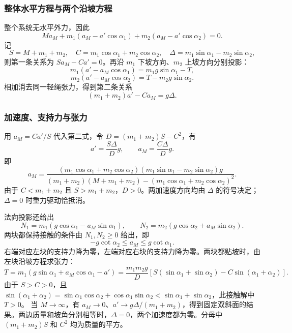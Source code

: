 \documentclass[UTF8,fontset=fandol,a4paper,11pt]{ctexart}
\begin{document}
\subsubsection*{整体水平方程与两个沿坡方程}
整个系统无水平外力，因此
\[
Ma_M+m_1(a_M-a'\cos\alpha_1)
+m_2(a_M-a'\cos\alpha_2)=0.
\]
记
\[
S=M+m_1+m_2,\quad C=m_1\cos\alpha_1+m_2\cos\alpha_2,
\quad\Delta=m_1\sin\alpha_1-m_2\sin\alpha_2,
\]
则第一条关系为 $Sa_M-Ca'=0$。再沿 $m_1$ 下坡方向、$m_2$ 上坡方向分别投影：
\[
m_1(a'-a_M\cos\alpha_1)=m_1g\sin\alpha_1-T,
\]
\[
m_2(a'-a_M\cos\alpha_2)=T-m_2g\sin\alpha_2.
\]
相加消去同一轻绳张力，得到第二条关系
\[
(m_1+m_2)a'-Ca_M=g\Delta.
\]
\subsubsection*{加速度、支持力与张力}
用 $a_M=Ca'/S$ 代入第二式，令 $D=(m_1+m_2)S-C^2$，有
\[
\boxed{a'=\frac{S\Delta}{D}g},\qquad
\boxed{a_M=\frac{C\Delta}{D}g}.
\]
即
\[
a_M=\frac{(m_1\cos\alpha_1+m_2\cos\alpha_2)
(m_1\sin\alpha_1-m_2\sin\alpha_2)g}
{(m_1+m_2)(M+m_1+m_2)-(m_1\cos\alpha_1+m_2\cos\alpha_2)^2}.
\]
由于 $C<m_1+m_2$ 且 $S>m_1+m_2$，$D>0$。两加速度方向均由 $\Delta$ 的符号决定；$\Delta=0$ 时重力驱动恰抵消。

法向投影还给出
\[
N_1=m_1(g\cos\alpha_1-a_M\sin\alpha_1),\qquad
N_2=m_2(g\cos\alpha_2+a_M\sin\alpha_2).
\]
两块都保持接触的条件由 $N_1,N_2\geq0$ 给出，即
\[
-g\cot\alpha_2\leq a_M\leq g\cot\alpha_1 .
\]
右端对应左块的支持力降为零，左端对应右块的支持力降为零。两块都贴坡时，由左块沿坡方程求张力：
\[
T=m_1(g\sin\alpha_1+a_M\cos\alpha_1-a')
=\frac{m_1m_2g}{D}
\left[S(\sin\alpha_1+\sin\alpha_2)-C\sin(\alpha_1+\alpha_2)\right].
\]
由于 $S>C>0$，且 $\sin(\alpha_1+\alpha_2)=\sin\alpha_1\cos\alpha_2+\cos\alpha_1\sin\alpha_2<\sin\alpha_1+\sin\alpha_2$，此接触解中 $T>0$。
当 $M\to\infty$，有 $a_M\to0$、$a'\to g\Delta/(m_1+m_2)$，得到固定双斜面的结果。两边质量和坡角分别相等时，$\Delta=0$，两个加速度都为零。分母中 $(m_1+m_2)S$ 和 $C^2$ 均为质量的平方。
\end{document}
